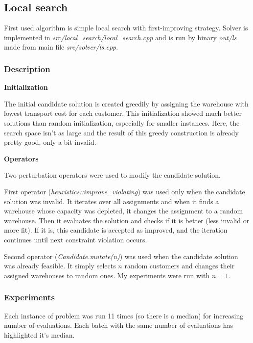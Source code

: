 \documentclass[./main.tex]{subfiles}
\begin{document}
\subsection{Local search}
First used algorithm is simple local search with first-improving strategy.
Solver is implemented in \textit{src/local\_search/local\_search.cpp} and is run by binary \textit{out/ls} made from main file \textit{src/solver/ls.cpp}.

\subsubsection{Description}
\textbf{Initialization}

The initial candidate solution is created greedily by assigning the warehouse with lowest transport cost for each customer.
This initialization showed much better solutions than random initialization, especially for smaller instances.
Here, the search space isn't as large and the result of this greedy construction is already pretty good, only a bit invalid.

\textbf{Operators}

Two perturbation operators were used to modify the candidate solution.

First operator (\textit{heuristics::improve\_violating}) was used only when the candidate solution was invalid.
It iterates over all assignments and when it finds a warehouse whose capacity was depleted, it changes the assignment to a random warehouse.
Then it evaluates the solution and checks if it is better (less invalid or more fit).
If it is, this candidate is accepted as improved, and the iteration continues until next constraint violation occurs.

Second operator (\textit{Candidate.mutate(n)}) was used when the candidate solution was already feasible.
It simply selects $n$ random customers and changes their assigned warehouses to random ones.
My experiments were run with $n = 1$.

\subsubsection{Experiments}

Each instance of problem was run 11 times (so there is a median) for increasing number of evaluations.
Each batch with the same number of evaluations has highlighted it's median.
\end{document}
